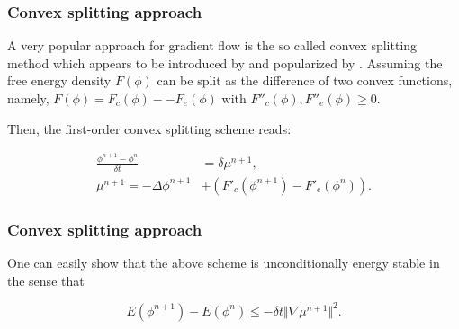 \documentclass{beamer}
\begin{document}
    \begin{frame}
    \frametitle{Convex splitting approach}

A very popular approach for gradient flow is the so called convex splitting method which appears to be introduced by \cite{doi:10.1137/0730084} and popularized by \cite{Eyre199839}. Assuming the free energy density $F(\phi)$ can be split as the difference of two convex functions, namely, $F(\phi)=F_c(\phi)-−F_e(\phi)$ with $F''_c(\phi), F''_e(\phi)\geq 0.$

 Then, the first-order convex splitting scheme reads:

\begin{equation}\label{Convex}
  \begin{split}
     \frac{\phi^{n+1}-\phi^n}{\delta t}&=\delta \mu^{n+1},\\
     \mu^{n+1} = -\Delta\phi^{n+1}&+(F'_c(\phi^{n+1})-F'_e(\phi^n)).
  \end{split}
\end{equation}

    \end{frame}
    \begin{frame}
    \frametitle{Convex splitting approach}
One can easily show that the above scheme is unconditionally energy stable in the sense that

$$
E(\phi^{n+1})-E(\phi^n)\leq -\delta t \Vert\nabla\mu^{n+1}\Vert^2.
$$



    \end{frame}
\end{document}
